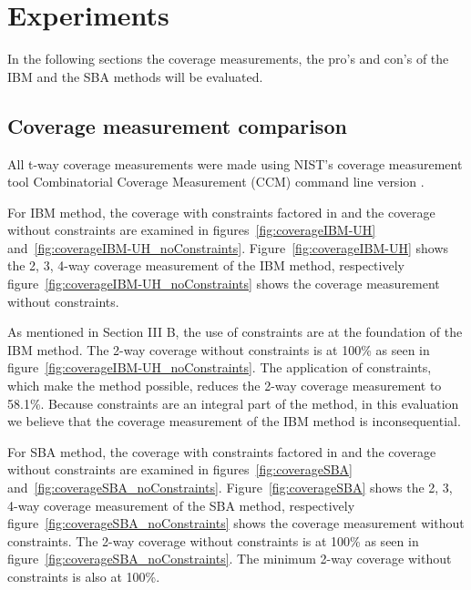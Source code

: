 \documentclass[conference]{IEEEtran}
\begin{document}
\section{Experiments}
	
	In the following sections the coverage measurements, the pro's and con's of the IBM and the SBA methods will be evaluated. 
		
	\subsection{Coverage measurement comparison}
	
	All t-way coverage measurements were made using NIST's coverage measurement tool Combinatorial Coverage Measurement (CCM) command line version \cite{kuhn2013combinatorial}.
	
		For IBM method, the coverage with constraints factored in and the coverage without constraints are examined in figures~\ref{fig:coverageIBM-UH} and~\ref{fig:coverageIBM-UH_noConstraints}.
	Figure~\ref{fig:coverageIBM-UH} shows the 2, 3, 4-way coverage measurement of the IBM method, respectively figure~\ref{fig:coverageIBM-UH_noConstraints} shows the coverage measurement without constraints. 
	
%	
	
	As mentioned in Section III B, the use of constraints are at the foundation of the IBM method. 
	The 2-way coverage without constraints is at 100\% as seen in figure~\ref{fig:coverageIBM-UH_noConstraints}.
	The application of constraints, which make the method possible, reduces the 2-way coverage measurement to 58.1\%. Because constraints are an integral part of the method, in this evaluation we believe that the coverage measurement of the IBM method is inconsequential. 
	
	For SBA method, the coverage with constraints factored in and the coverage without constraints are examined in figures~\ref{fig:coverageSBA} and~\ref{fig:coverageSBA_noConstraints}.
	Figure~\ref{fig:coverageSBA} shows the 2, 3, 4-way coverage measurement of the SBA method, respectively figure~\ref{fig:coverageSBA_noConstraints} shows the coverage measurement without constraints.
	The 2-way coverage without constraints is at 100\% as seen in figure~\ref{fig:coverageSBA_noConstraints}. The minimum 2-way coverage without constraints is also at 100\%. 
	
\end{document}
